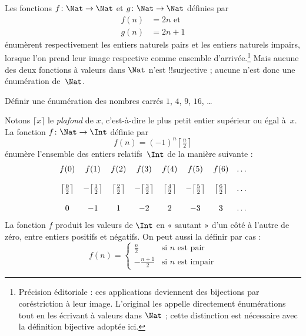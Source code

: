 \documentclass[11pt,a4paper,openany]{memoir}
\begin{document}
\begin{ex}
Les fonctions $f\colon \Nat \to \Nat$ et $g \colon \Nat \to \Nat$
définies par
\begin{align*}
  f(n) & = 2n \text{ et}\\
  g(n) & = 2n+1
\end{align*}
énumèrent respectivement les entiers naturels pairs et les entiers
naturels impairs, lorsque l'on prend leur image respective comme
ensemble d'arrivée.\footnote{Précision éditoriale : ces applications
deviennent des bijections par coréstriction à leur image.
L'original les appelle directement énumérations tout en les écrivant
à valeurs dans $\Nat$ ; cette distinction est nécessaire avec
la définition bijective adoptée ici.}
Mais aucune des deux fonctions à valeurs dans $\Nat$ n'est
!!{surjective} ; aucune n'est donc une énumération de~$\Nat$.
\end{ex}

\begin{prob}
Définir une énumération des nombres carrés $1$, $4$, $9$, $16$, \dots
\end{prob}

\begin{ex}
Notons $\lceil x \rceil$ le \emph{plafond} de $x$, c'est-à-dire
le plus petit entier supérieur ou égal à~$x$. La fonction
$f \colon \Nat \to \Int$ définie par
\[
  f(n) = (-1)^{n} \left\lceil\tfrac{n}{2}\right\rceil
\]
énumère l'ensemble des entiers relatifs~$\Int$ de la manière suivante :
\[
\begin{array}{c c c c c c c c}
f(0) & f(1) & f(2) & f(3) & f(4) & f(5) & f(6) & \dots \\ \\
\big\lceil \tfrac{0}{2} \big\rceil & -\big\lceil \tfrac{1}{2}\big\rceil &  \big\lceil \tfrac{2}{2} \big\rceil & -\big\lceil \tfrac{3}{2} \big\rceil & \big\lceil \tfrac{4}{2} \big\rceil  & -\big\lceil \tfrac{5}{2}\big\rceil & \big\lceil \tfrac{6}{2} \big\rceil & \dots \\ \\
0 & -1 & 1 & -2 & 2 & -3 & 3& \dots
\end{array}
\]
La fonction $f$ produit les valeurs de $\Int$ en « sautant »
d'un côté à l'autre de zéro, entre entiers positifs et négatifs.
On peut aussi la définir par cas :
\[
f(n) = \begin{cases}
  \frac{n}{2} & \text{si $n$ est pair}\\
  -\frac{n+1}{2} & \text{si $n$ est impair}
  \end{cases}
\]
\end{ex}
\end{document}

